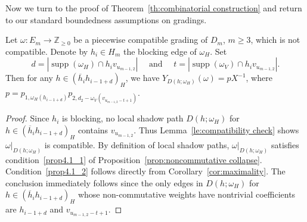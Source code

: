 \documentclass[ALCO,ThmDefs,Unicode,epreuves]{cedram}
\newcommand{\ZZ}{\mathbb{Z}}
\DeclareMathOperator{\supp}{supp}
\begin{document}
Now we turn to the proof of Theorem~\ref{th:combinatorial construction} and return to our standard boundedness assumptions on gradings.
\begin{lemma}
 \label{le:noncommutative collapse}
 Let $\omega:E_m\to\ZZ_{\ge0}$ be a piecewise compatible grading of $D_m$, $m\ge3$, which is not compatible.
 Denote by $h_i\in H_m$ the blocking edge of $\omega_H$. 
 Set 
 \[d=|\supp(\omega_H)\cap h_iv_{u_{m-1,2}}|\quad\text{ and }\quad t=|\supp(\omega_V)\cap h_iv_{u_{m-1,2}}|.\]
 Then for any $h\in(\overline{h}_ih_{i-1+d})_H$, we have $Y_{D(h;\omega_H)}(\omega)=pX^{-1}$, where $p=p_{1,\omega_H(h_{i-1+d})}p_{2,d_2-\omega_V(v_{u_{m-1,2}-t+1})}$.
\end{lemma}
\begin{proof}
 Since $h_i$ is blocking, no local shadow path $D(h;\omega_H)$ for $h\in(\overline{h}_ih_{i-1+d})_H$ contains $v_{u_{m-1,2}}$.
 Thus Lemma~\ref{le:compatibility check} shows $\omega|_{D(h;\omega_H)}$ is compatible.
 By definition of local shadow paths, $\omega|_{D(h;\omega_H)}$ satisfies condition~\ref{prop4.1_1} of Proposition~\ref{prop:noncommutative collapse}.
 Condition~\ref{prop4.1_2} follows directly from Corollary~\ref{cor:maximality}.
 The conclusion immediately follows since the only edges in $D(h;\omega_H)$ for $h\in(\overline{h}_ih_{i-1+d})_H$ whose non-commutative weights have nontrivial coefficients are $h_{i-1+d}$ and $v_{u_{m-1,2}-t+1}$.
\end{proof}
\end{document}

